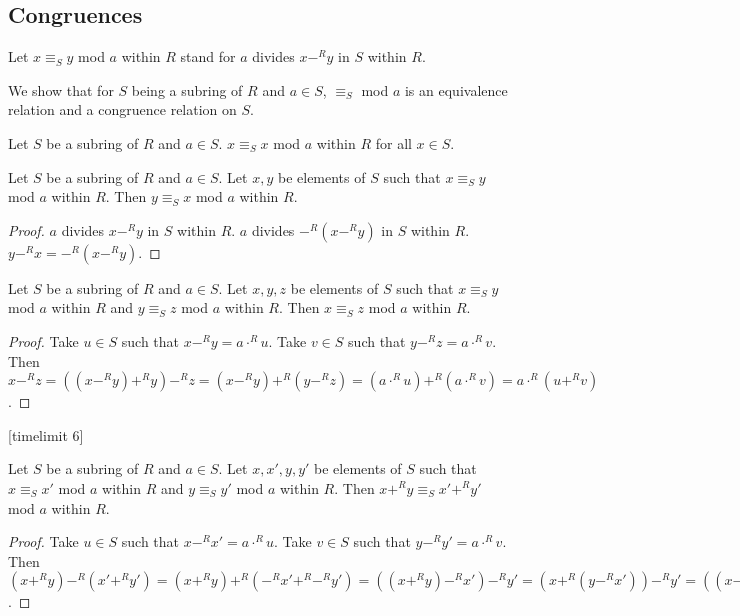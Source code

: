 \documentclass[11pt]{article}
\begin{document}
\subsection{Congruences}
\begin{forthel}
Let $x \equiv_{S} y$ mod $a$ within $R$ stand for $a$ divides $x-^{R} y$ in $S$ within $R$.

\end{forthel}
We show that for $S$ being a subring of $R$ and $a \in S$, $\equiv_{S}$ mod $a$ is an equivalence relation and
a congruence relation on $S$.

\begin{forthel}

\begin{lemma}
Let $S$ be a subring of $R$ and $a \in S$.
$x \equiv_{S} x$ mod $a$ within $R$ for all $x \in S$.
\end{lemma}

\begin{lemma}
Let $S$ be a subring of $R$ and $a \in S$.
Let $x,y$ be elements of $S$ such that
$x \equiv_{S} y$ mod $a$ within $R$. 
Then $y \equiv_{S} x$ mod $a$ within $R$.
\end{lemma}
\begin{proof}
$a$ divides  $x-^{R} y$ in $S$ within $R$.
$a$ divides  $-^{R}(x-^{R} y)$ in $S$ within $R$.
$y -^{R} x = -^{R}(x -^{R} y)$.
\end{proof}

\begin{lemma}
Let $S$ be a subring of $R$ and $a \in S$.
Let $x,y,z$ be elements of $S$ such that
$x \equiv_{S} y$ mod $a$ within $R$
and $y \equiv_{S} z$ mod $a$ within $R$. 
Then $x \equiv_{S} z$ mod $a$ within $R$.
\end{lemma}
\begin{proof}
Take $u \in S$ such that $x -^{R} y = a \cdot^{R} u$.
Take $v \in S$ such that $y -^{R} z = a \cdot^{R} v$.
Then
 $x -^{R} z =  
((x -^{R} y) +^{R} y) -^{R} z =
(x -^{R} y) +^{R} (y -^{R} z) =
(a \cdot^{R} u) +^{R} (a \cdot^{R} v) =
a \cdot^{R} (u +^{R} v)
$.
\end{proof}

[timelimit 6]
\begin{lemma}
Let $S$ be a subring of $R$ and $a \in S$.
Let $x,x',y,y'$ be elements of $S$ such that
$x \equiv_{S} x'$ mod $a$ within $R$
and $y \equiv_{S} y'$ mod $a$ within $R$. 
Then $x +^{R} y \equiv_{S} x' +^{R} y'$ mod $a$ within $R$.
\end{lemma}
\begin{proof}
Take $u \in S$ such that $x -^{R} x' = a \cdot^{R} u$.
Take $v \in S$ such that $y -^{R} y' = a \cdot^{R} v$.
Then
$(x +^{R} y) -^{R} (x' +^{R} y')  =  (x +^{R} y) +^{R} (-^{R} x' +^{R} -^{R} y')
= ((x +^{R} y) -^{R} x') -^{R} y' 
= (x +^{R} (y -^{R} x')) -^{R} y'
= ((x -^{R} x') +^{R} y) -^{R} y'
= (x -^{R} x') +^{R} (y -^{R} y')
= (a \cdot^{R} u) +^{R} (a \cdot^{R} v)$.


\end{proof}
\end{forthel}
\end{document}
